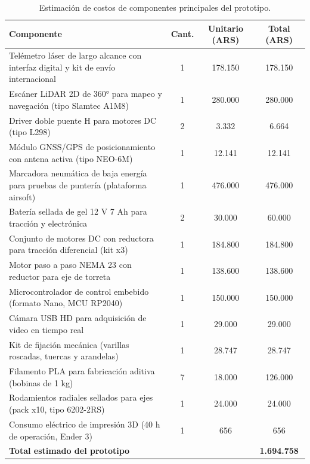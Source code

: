\begin{table}[H]
\centering
\small
\begin{tabular}{p{6.1cm} c c c}
\toprule
\textbf{Componente} & \textbf{Cant.} & \textbf{Unitario (ARS)} & \textbf{Total (ARS)} \\
\midrule
Telémetro láser de largo alcance con interfaz digital y kit de envío internacional & 1 & 178.150 & 178.150 \\
Escáner LiDAR 2D de 360° para mapeo y navegación (tipo Slamtec A1M8) & 1 & 280.000 & 280.000 \\
Driver doble puente H para motores DC (tipo L298) & 2 & 3.332 & 6.664 \\
Módulo GNSS/GPS de posicionamiento con antena activa (tipo NEO-6M) & 1 & 12.141 & 12.141 \\
Marcadora neumática de baja energía para pruebas de puntería (plataforma airsoft) & 1 & 476.000 & 476.000 \\
Batería sellada de gel 12 V 7 Ah para tracción y electrónica & 2 & 30.000 & 60.000 \\
Conjunto de motores DC con reductora para tracción diferencial (kit x3) & 1 & 184.800 & 184.800 \\
Motor paso a paso NEMA 23 con reductor para eje de torreta & 1 & 138.600 & 138.600 \\
Microcontrolador de control embebido (formato Nano, MCU RP2040) & 1 & 150.000 & 150.000 \\
Cámara USB HD para adquisición de video en tiempo real & 1 & 29.000 & 29.000 \\
Kit de fijación mecánica (varillas roscadas, tuercas y arandelas) & 1 & 28.747 & 28.747 \\
Filamento PLA para fabricación aditiva (bobinas de 1 kg) & 7 & 18.000 & 126.000 \\
Rodamientos radiales sellados para ejes (pack x10, tipo 6202-2RS) & 1 & 24.000 & 24.000 \\
Consumo eléctrico de impresión 3D (40 h de operación, Ender 3) & 1 & 656 & 656 \\
\midrule
\textbf{Total estimado del prototipo} &  &  & \textbf{1.694.758} \\
\bottomrule
\end{tabular}
\caption{Estimación de costos de componentes principales del prototipo.}
\label{tab:costos_prototipo}
\end{table}